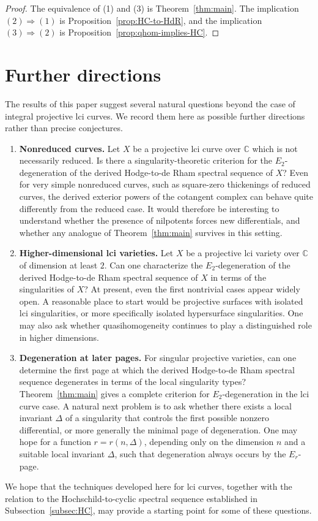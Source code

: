 \documentclass[12pt,reqno]{amsart}
\begin{document}
\begin{proof}
The equivalence of (1) and (3) is Theorem~\ref{thm:main}. 
The implication
\((2)\Longrightarrow (1)\)
is Proposition~\ref{prop:HC-to-HdR}, and the implication
\((3)\Longrightarrow (2)\)
is Proposition~\ref{prop:qhom-implies-HC}.
\end{proof}

\section{Further directions}\label{sec:further-directions}

The results of this paper suggest several natural questions beyond the case of integral projective lci curves. We record them here as possible further directions rather than precise conjectures.

\begin{enumerate}
\item \textbf{Nonreduced curves.}
Let $X$ be a projective lci curve over \(\mathbb C\) which is not necessarily reduced. Is there a singularity-theoretic criterion for the \(E_2\)-degeneration of the derived Hodge-to-de Rham spectral sequence of $X$? Even for very simple nonreduced curves, such as square-zero thickenings of reduced curves, the derived exterior powers of the cotangent complex can behave quite differently from the reduced case. It would therefore be interesting to understand whether the presence of nilpotents forces new differentials, and whether any analogue of Theorem~\ref{thm:main} survives in this setting.

\item \textbf{Higher-dimensional lci varieties.}
Let $X$ be a projective lci variety over \(\mathbb C\) of dimension at least $2$. Can one characterize the \(E_2\)-degeneration of the derived Hodge-to-de Rham spectral sequence of $X$ in terms of the singularities of $X$? At present, even the first nontrivial cases appear widely open. A reasonable place to start would be projective surfaces with isolated lci singularities, or more specifically isolated hypersurface singularities. One may also ask whether quasihomogeneity continues to play a distinguished role in higher dimensions.

\item \textbf{Degeneration at later pages.}
For singular projective varieties, can one determine the first page at which the derived Hodge-to-de Rham spectral sequence degenerates in terms of the local singularity types? Theorem~\ref{thm:main} gives a complete criterion for \(E_2\)-degeneration in the lci curve case. A natural next problem is to ask whether there exists a local invariant \(\Delta\) of a singularity that controls the first possible nonzero differential, or more generally the minimal page of degeneration. One may hope for a function \(r=r(n,\Delta)\), depending only on the dimension \(n\) and a suitable local invariant \(\Delta\), such that degeneration always occurs by the \(E_r\)-page.
\end{enumerate}

We hope that the techniques developed here for lci curves, together with the relation to the Hochschild-to-cyclic spectral sequence established in Subsection~\ref{subsec:HC}, may provide a starting point for some of these questions. 

\printbibliography
\end{document}
